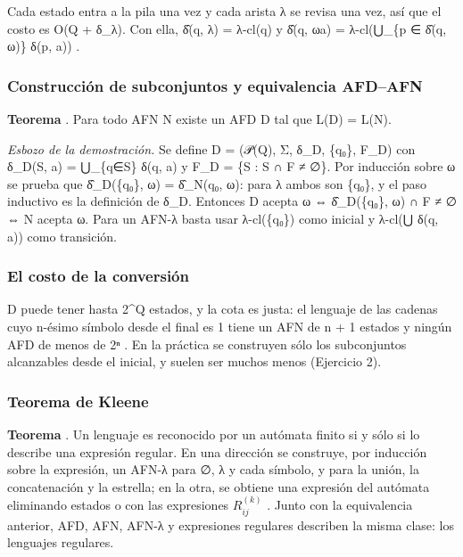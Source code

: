 Cada estado entra a la pila una vez y cada arista λ se revisa una vez, así que el costo es O(\textbar Q\textbar{} + \textbar δ\_λ\textbar). Con ella, δ̂(q, λ) = λ-cl(q) y δ̂(q, ωa) = λ-cl(⋃\_\{p ∈ δ̂(q, ω)\} δ(p, a)) \autocite[sec.~2.5.3]{hopcroft2007}.

\hypertarget{construcciuxf3n-de-subconjuntos-y-equivalencia-afdafn}{%
\subsubsection{Construcción de subconjuntos y equivalencia AFD--AFN}\label{construcciuxf3n-de-subconjuntos-y-equivalencia-afdafn}}

\textbf{Teorema} \autocites{rabin1959}[sec.~2.3.5]{hopcroft2007}. Para todo AFN N existe un AFD D tal que L(D) = L(N).

\emph{Esbozo de la demostración.} Se define D = (𝒫(Q), Σ, δ\_D, \{q₀\}, F\_D) con δ\_D(S, a) = ⋃\_\{q∈S\} δ(q, a) y F\_D = \{S : S ∩ F ≠ ∅\}. Por inducción sobre \textbar ω\textbar{} se prueba que δ̂\_D(\{q₀\}, ω) = δ̂\_N(q₀, ω): para λ ambos son \{q₀\}, y el paso inductivo es la definición de δ\_D. Entonces D acepta ω ⇔ δ̂\_D(\{q₀\}, ω) ∩ F ≠ ∅ ⇔ N acepta ω. Para un AFN-λ basta usar λ-cl(\{q₀\}) como inicial y λ-cl(⋃ δ(q, a)) como transición.

\hypertarget{el-costo-de-la-conversiuxf3n}{%
\subsubsection{El costo de la conversión}\label{el-costo-de-la-conversiuxf3n}}

D puede tener hasta 2\^{}\textbar Q\textbar{} estados, y la cota es justa: el lenguaje de las cadenas cuyo n-ésimo símbolo desde el final es 1 tiene un AFN de n + 1 estados y ningún AFD de menos de 2ⁿ \autocite[sec.~2.3.6]{hopcroft2007}. En la práctica se construyen sólo los subconjuntos alcanzables desde el inicial, y suelen ser muchos menos (Ejercicio 2).

\hypertarget{teorema-de-kleene}{%
\subsubsection{Teorema de Kleene}\label{teorema-de-kleene}}

\textbf{Teorema} \autocite{kleene1956}. Un lenguaje es reconocido por un autómata finito si y sólo si lo describe una expresión regular. En una dirección se construye, por inducción sobre la expresión, un AFN-λ para ∅, λ y cada símbolo, y para la unión, la concatenación y la estrella; en la otra, se obtiene una expresión del autómata eliminando estados o con las expresiones \(R_{ij}^{(k)}\) \autocite[sec.~3.2]{hopcroft2007}. Junto con la equivalencia anterior, AFD, AFN, AFN-λ y expresiones regulares describen la misma clase: los lenguajes regulares.

